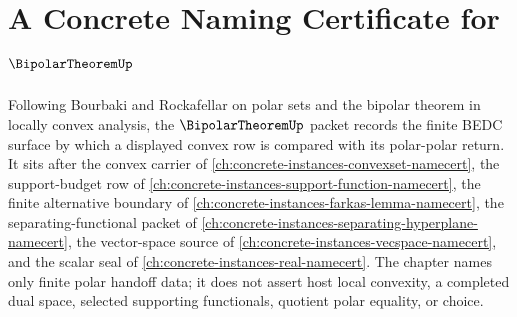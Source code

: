 \chapter{A Concrete Naming Certificate for $\BipolarTheoremUp$}
\label{ch:concrete-instances-bipolar-theorem-namecert}

Following Bourbaki and Rockafellar on polar sets and the bipolar theorem in locally convex analysis, the $\BipolarTheoremUp$ packet records the finite BEDC surface by which a displayed convex row is compared with its polar-polar return. It sits after the convex carrier of \autoref{ch:concrete-instances-convexset-namecert}, the support-budget row of \autoref{ch:concrete-instances-support-function-namecert}, the finite alternative boundary of \autoref{ch:concrete-instances-farkas-lemma-namecert}, the separating-functional packet of \autoref{ch:concrete-instances-separating-hyperplane-namecert}, the vector-space source of \autoref{ch:concrete-instances-vecspace-namecert}, and the scalar seal of \autoref{ch:concrete-instances-real-namecert}. The chapter names only finite polar handoff data; it does not assert host local convexity, a completed dual space, selected supporting functionals, quotient polar equality, or choice.

